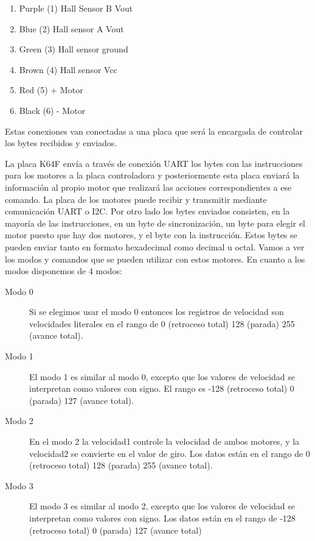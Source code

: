 \begin{enumerate}
\item Purple (1) Hall Sensor B Vout
\item Blue (2) Hall sensor A Vout
\item Green (3) Hall sensor ground
\item Brown (4) Hall sensor Vcc
\item Red (5) + Motor
\item Black (6) - Motor
\end{enumerate}

Estas conexiones van conectadas a una  placa que será la encargada de controlar los bytes recibidos y enviados.


La placa K64F envía a través de conexión UART los bytes con las instrucciones para los motores a la placa controladora y posteriormente esta placa enviará la información al propio motor que realizará las acciones correspondientes a ese comando. 
La placa de los motores puede recibir y transmitir mediante comunicación UART o I2C. Por otro lado los bytes enviados consisten, en la mayoría de las instrucciones, en un byte de sincronización, un byte para elegir el motor puesto que hay dos motores, y el byte con la instrucción. Estos bytes se pueden enviar tanto en formato hexadecimal como decimal u octal.
Vamos a ver los modos y comandos que se pueden utilizar con estos motores.
En cuanto a los modos disponemos de 4 modos:
\begin{description}
\item[Modo 0] Si se elegimos usar el modo 0 entonces los registros de velocidad son velocidades literales en el rango de 0 (retroceso total)
128 (parada) 255 (avance total).
\item[Modo 1] El modo 1 es similar al modo 0, excepto que los valores de velocidad se interpretan como valores con signo. El rango es -128
(retroceso total) 0 (parada) 127 (avance total).
\item[Modo 2] En el modo 2 la velocidad1 controle la velocidad de ambos motores, y la velocidad2 se convierte en el valor de giro. Los datos están en el rango de 0 (retroceso total) 128 (parada) 255 (avance total).
\item[Modo 3] El modo 3 es similar al modo 2, excepto que los valores de velocidad se interpretan como valores con signo. Los datos están en el rango de -128 (retroceso total) 0 (parada) 127 (avance total)
\end{description}

